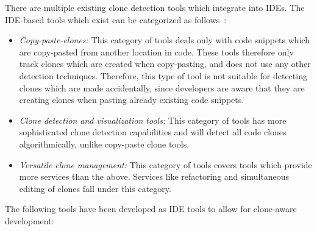 There are multiple existing clone detection tools which integrate into IDEs. The IDE-based
tools which exist can be categorized as
follows~\cite[8]{Udding_Towards_Convenient_Management}:

\begin{itemize}
	\item\textit{Copy-paste-clones:} This category of tools deals only with code snippets which are
	copy-pasted from another location in code. These tools therefore only track clones which
	are created when copy-pasting, and does not use any other detection techniques. Therefore,
	this type of tool is not suitable for detecting clones which are made accidentally, since
	developers are aware that they are creating clones when pasting already existing code
	snippets.

    \item\textit{Clone detection and visualization tools:} This category of tools has more
        sophisticated clone detection capabilities and will detect all code clones
        algorithmically, unlike copy-paste clone tools.

    \item\textit{Versatile clone management:} This category of tools covers tools which
        provide more services than the above. Services like refactoring and simultaneous
        editing of clones fall under this category.

\end{itemize}

The following tools have been developed as IDE tools to allow for clone-aware development:

